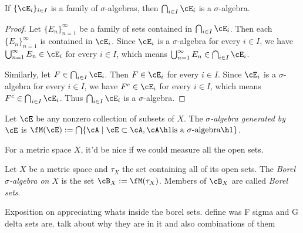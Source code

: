     \begin{proposition}
        If $\{\cE_i\}_{i \in I}$ is a family of $\sigma$-algebras, then $\bigcap_{i \in I}\cE_i$ is a $\sigma$-algebra.
    \end{proposition}
        \begin{proof}
            Let $\{E_n\}_{n = 1}^\infty$ be a family of sets contained in $\bigcap_{i \in I}\cE_i$. Then each $\{E_n\}_{n = 1}^\infty$ is contained in $\cE_i$. Since $\cE_i$ is a $\sigma$-algebra for every $i \in I$, we have $\bigcup_{n = 1}^\infty E_n \in \cE_i$ for every $i \in I$, which means $\bigcup_{n = 1}^\infty E_n \in \bigcap_{i \in I}\cE_i$.

            Similarly, let $F \in \bigcap_{i \in I}\cE_i$. Then $F \in \cE_i$ for every $i \in I$. Since $\cE_i$ is a $\sigma$-algebra for every $i \in I$, we have $F^c \in \cE_i$ for every $i \in I$, which means $F^c \in \bigcap_{i \in I}\cE_i$. Thus $\bigcap_{i \in I}\cE_i$ is a $\sigma$-algebra.
        \end{proof}

    \begin{definition}
        Let $\cE$ be any nonzero collection of subsets of $X$. The \textit{$\sigma$-algebra generated by $\cE$} is $\fM(\cE) := \bigcap \{\cA \mid \cE \subset \cA, \cA \h1\text{is a $\sigma$-algebra}\h1\}$.
    \end{definition}

    For a metric space $X$, it'd be nice if we could measure all the open sets.

    \begin{definition}
        Let $X$ be a metric space and $\tau_X$ the set containing all of its open sets. The \textit{Borel $\sigma$-algebra on $X$} is the set $\cB_X := \fM(\tau_X)$. Members of $\cB_X$ are called \textit{Borel sets}.
    \end{definition}

    Exposition on appreciating whats inside the borel sets. define was F sigma and G delta sets are. talk about why they are in it and also combinations of them

